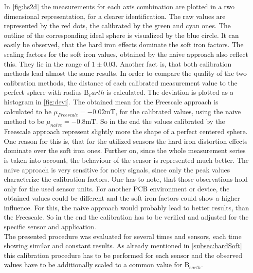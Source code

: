 In \ref{fig:hs2d} the measurements for each axis combination are plotted in a two dimensional representation, for a clearer identification. The raw values are represented by the red dots, the calibrated by the green and cyan ones. The outline of the corresponding ideal sphere is visualized by the blue circle. It can easily be observed, that the hard iron effects dominate the soft iron factors. The scaling factors for the soft iron values, obtained by the naive approach also reflect this. They lie in the range of $ 1 \pm 0.03 $. Another fact is, that both calibration methods lead almost the same results. In order to compare the quality of the two calibration methods, the distance of each calibrated measurement value to the perfect sphere with radius $ \mathrm{B}_earth $ is calculated. The deviation is plotted as a histogram in \ref{fig:devi}. The obtained mean for the Freescale approach is calculated to be $ \mu_{Freescale} = -0.02\si{\milli \tesla} $, for the calibrated values, using the naive method to be $ \mu_{naive} = -0.8\si{\milli \tesla} $. So in the end the values calibrated by the Freescale approach represent slightly more the shape of a perfect centered sphere. One reason for this is, that for the utilized sensors the hard iron distortion effects dominate over the soft iron ones. Further on, since the whole measurement series is taken into account, the behaviour of the sensor is represented much better. The naive approach is very sensitive for noisy signals, since only the peak values characterize the calibration factors. One has to note, that those observations hold only for the used sensor units. For another \ac{PCB} environment or device, the obtained values could be different and the soft iron factors could show a higher influence. For this, the naive approach would probably lead to better results, than the Freescale. So in the end the calibration has to be verified and adjusted for the specific sensor and application.\\
The presented procedure was evaluated for several times and sensors, each time showing similar and constant results. As already mentioned in \ref{subsec:hardSoft} this calibration procedure has to be performed for each sensor and the observed values have to be additionally scaled to a common value for $ \mathrm{B}_{earth} $.
